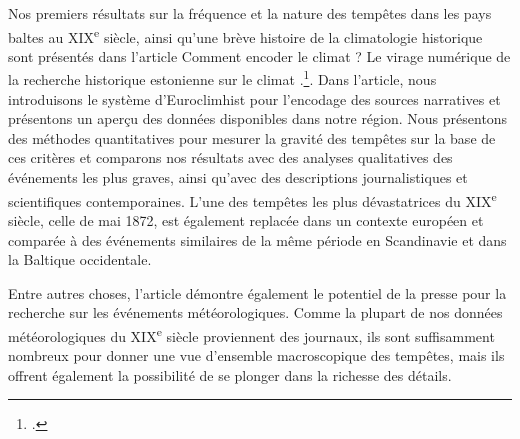 \documentclass[a4paper,twoside,12pt]{article}
\begin{document}
Nos premiers résultats sur la fréquence et la nature des tempêtes dans les pays baltes au XIX\textsuperscript{e} siècle, ainsi qu'une brève histoire de la climatologie historique sont présentés dans l'article \og Comment encoder le climat ? Le virage numérique de la recherche historique estonienne sur le climat \fg{}.\footcite{plath_kuidas_2021}. Dans l'article, nous introduisons le système d'Euroclimhist pour l'encodage des sources narratives et présentons un aperçu des données disponibles dans notre région. Nous présentons des méthodes quantitatives pour mesurer la gravité des tempêtes sur la base de ces critères et comparons nos résultats avec des analyses qualitatives des événements les plus graves, ainsi qu'avec des descriptions journalistiques et scientifiques contemporaines. L'une des tempêtes les plus dévastatrices du XIX\textsuperscript{e} siècle, celle de mai 1872, est également replacée dans un contexte européen et comparée à des événements similaires de la même période en Scandinavie et dans la Baltique occidentale.

Entre autres choses, l'article démontre également le potentiel de la presse pour la recherche sur les événements météorologiques. Comme la plupart de nos données météorologiques du XIX\textsuperscript{e} siècle proviennent des journaux, ils sont suffisamment nombreux pour donner une vue d'ensemble macroscopique des tempêtes, mais ils offrent également la possibilité de se plonger dans la richesse des détails.


\end{document}
